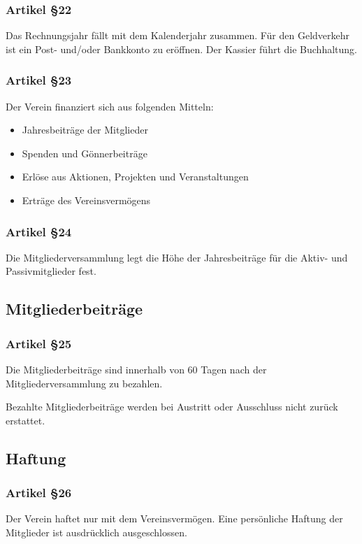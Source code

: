\documentclass[a4paper,
               10pt,
               fleqn]{article}
\begin{document}
\subsubsection*{Artikel §22}
Das Rechnungsjahr fällt mit dem Kalenderjahr zusammen. Für
den Geldverkehr ist ein Post- und/oder Bankkonto zu
eröffnen. Der Kassier führt die Buchhaltung.

\subsubsection*{Artikel §23}
Der Verein finanziert sich aus folgenden Mitteln:
\begin{itemize}
\item Jahresbeiträge der Mitglieder
\item Spenden und Gönnerbeiträge
\item Erlöse aus Aktionen, Projekten und Veranstaltungen
\item Erträge des Vereinsvermögens
\end{itemize}
 
\subsubsection*{Artikel §24}
Die Mitgliederversammlung legt die Höhe der Jahresbeiträge 
für die Aktiv- und Passivmitglieder fest.

\subsection{Mitgliederbeiträge}

\subsubsection*{Artikel §25}
Die Mitgliederbeiträge sind innerhalb von 60 Tagen nach der 
Mitgliederversammlung zu bezahlen.

Bezahlte Mitgliederbeiträge werden bei Austritt oder 
Ausschluss nicht zurück erstattet.

\subsection{Haftung}

\subsubsection*{Artikel §26}
Der Verein haftet nur mit dem Vereinsvermögen. Eine
persönliche Haftung der Mitglieder ist ausdrücklich
ausgeschlossen.
\end{document}
